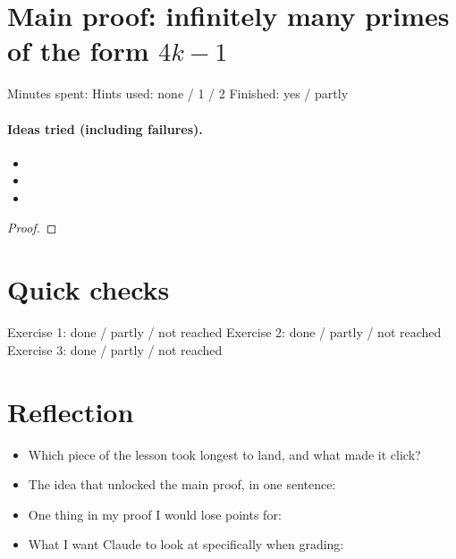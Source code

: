 \documentclass[11pt]{article}
\begin{document}

\section*{Main proof: infinitely many primes of the form $4k-1$}
Minutes spent: \blank[1cm] \qquad Hints used: none / 1 / 2 \qquad Finished: yes / partly

\paragraph{Ideas tried (including failures).}
\begin{itemize}
  \item
  \item
  \item
\end{itemize}

\begin{claim}
\end{claim}

\begin{proof}
\end{proof}

\section*{Quick checks}
Exercise 1: done / partly / not reached \qquad
Exercise 2: done / partly / not reached \qquad
Exercise 3: done / partly / not reached

\section*{Reflection}
\begin{itemize}
  \item Which piece of the lesson took longest to land, and what made it click?
  \item The idea that unlocked the main proof, in one sentence:
  \item One thing in my proof I would lose points for:
  \item What I want Claude to look at specifically when grading:
\end{itemize}
\end{document}
